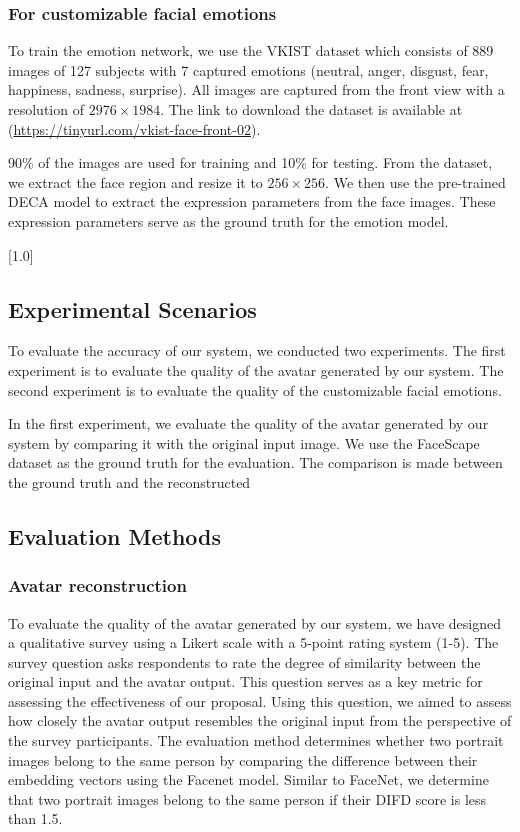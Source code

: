 \subsubsection{For customizable facial emotions}
To train the emotion network, we use the VKIST dataset which consists of 889 images of 127 subjects with 7 captured emotions (neutral, anger, disgust, fear, happiness, sadness, surprise). All images are captured from the front view with a resolution of $2976\times1984$. The link to download the dataset is available at (\url{https://tinyurl.com/vkist-face-front-02}).

90\% of the images are used for training and 10\% for testing. From the dataset, we extract the face region and resize it to $256\times256$. We then use the pre-trained DECA model to extract the expression parameters from the face images. These expression parameters serve as the ground truth for the emotion model.

[1.0]

\subsection{Experimental Scenarios}
To evaluate the accuracy of our system, we conducted two experiments. The first experiment is to evaluate the quality of the avatar generated by our system. The second experiment is to evaluate the quality of the customizable facial emotions.

In the first experiment, we evaluate the quality of the avatar generated by our system by comparing it with the original input image. We use the FaceScape dataset as the ground truth for the evaluation. The comparison is made between the ground truth and the reconstructed 


\subsection{Evaluation Methods}
\subsubsection{Avatar reconstruction}
To evaluate the quality of the avatar generated by our system, we have designed a qualitative survey using a Likert scale with a 5-point rating system (1-5). The survey question asks respondents to rate the degree of similarity between the original input and the avatar output. This question serves as a key metric for assessing the effectiveness of our proposal.
Using this question, we aimed to assess how closely the avatar output resembles the original input from the perspective of the survey participants.
The  evaluation method determines whether two portrait images belong to the same person by comparing the difference between their embedding vectors using the Facenet model. Similar to FaceNet, we determine that two portrait images belong to the same person if their DIFD score is less than 1.5.

